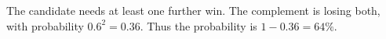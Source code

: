 The candidate needs at least one further win. The complement is losing both, with probability $0.6^2=0.36$. Thus the probability is $1-0.36=\boxed{64\%}$.
